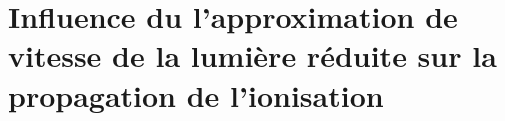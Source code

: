 \chapter[Influence de la RSLA sur la propagation de l'ionisation]{Influence du l'approximation de vitesse de la lumière réduite sur la propagation de l'ionisation}
\label{sec:intre:zreio}







